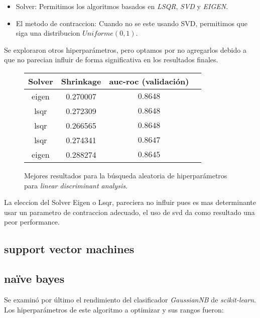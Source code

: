\begin{itemize}
    \item Solver: Permitimos los algoritmos basados en \textit{LSQR}, \textit{SVD} y \textit{EIGEN}.
    \item El metodo de contraccion: Cuando no se este usando SVD, permitimos que siga una distribucion $Uniforme(0,1)$.
\end{itemize}

Se exploraron otros hiperparámetros, pero optamos por no agregarlos debido a que no parecian influir de forma significativa en los resultados finales. 

\vspace{0.5em}
\begin{figure}[!htbp]
    \begin{center}
        \begin{tabular}{ |c|c|c|c| } 
         \hline
        Solver   & Shrinkage & auc-roc (validación) \\
        \hline
        eigen                   &  0.270007          & $0.8648$  \\ 
        lsqr                    &  0.272309          & $0.8648$  \\
        lsqr                    &  0.266565          & $0.8648$  \\ 
        lsqr                    &  0.274341          & $0.8647$  \\
        eigen                   &  0.288274          & $0.8645$  \\ 
        \hline
        \end{tabular}
    \end{center}
    \caption{Mejores resultados para la búsqueda aleatoria de hiperparámetros para \textit{linear discriminant analysis}.} \label{lda}
\end{figure}

La eleccion del Solver Eigen o Lsqr, pareciera no influir pues es mas determinante usar un parametro de contraccion adecuado, el uso de svd da como resultado una peor performance. 
\subsection{support vector machines}

\subsection{naïve bayes}
Se examinó por último el rendimiento del clasificador \textit{GaussianNB} de \textit{scikit-learn}. Los hiperparámetros de este algoritmo a optimizar y sus rangos fueron:

